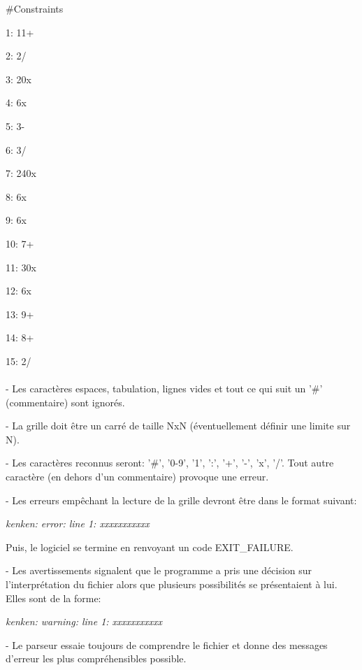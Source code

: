 \documentclass[1]{report}
\begin{document}
    \#Constraints \newline
    \par
    1: 11+ \par
    2: 2/ \par
    3: 20x \par
    4: 6x \par
    5: 3- \par
    6: 3/ \par
    7: 240x \par
    8: 6x \par
    9: 6x \par
    10: 7+ \par
    11: 30x \par
    12: 6x \par
    13: 9+ \par
    14: 8+ \par
    15: 2/ \\~\\
  
    - Les caractères espaces, tabulation, lignes vides et tout ce qui suit un '\#' (commentaire) sont ignorés. \newline

    - La grille doit être un carré de taille NxN (éventuellement définir une limite sur N).

    - Les caractères reconnus seront: '\#', '0-9', '1', ':', '+', '-', 'x', '/'.
    Tout autre caractère (en dehors d'un commentaire) provoque une erreur.

    - Les erreurs empêchant la lecture de la grille devront être dans le format suivant: \newline
    
    \textit{kenken: error: line 1: xxxxxxxxxxx} \newline

    Puis, le logiciel se termine en renvoyant un code EXIT\_FAILURE. \newline

    - Les avertissements signalent que le programme a pris une décision sur l'interprétation du fichier alors que plusieurs possibilités se présentaient à lui. Elles sont de la forme: \newline
    
    \textit{kenken: warning: line 1: xxxxxxxxxxx} \newline

    - Le parseur essaie toujours de comprendre le fichier et donne des messages d'erreur les plus compréhensibles possible. \newline
\end{document}
